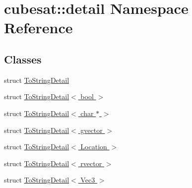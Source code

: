 \hypertarget{namespacecubesat_1_1detail}{}\section{cubesat\+:\+:detail Namespace Reference}
\label{namespacecubesat_1_1detail}
\subsection*{Classes}
\begin{DoxyCompactItemize}
\item 
struct \hyperlink{structcubesat_1_1detail_1_1ToStringDetail}{To\+String\+Detail}
\item 
struct \hyperlink{structcubesat_1_1detail_1_1ToStringDetail_3_01bool_01_4}{To\+String\+Detail$<$ bool $>$}
\item 
struct \hyperlink{structcubesat_1_1detail_1_1ToStringDetail_3_01char_01_5_01_4}{To\+String\+Detail$<$ char $\ast$ $>$}
\item 
struct \hyperlink{structcubesat_1_1detail_1_1ToStringDetail_3_01gvector_01_4}{To\+String\+Detail$<$ gvector $>$}
\item 
struct \hyperlink{structcubesat_1_1detail_1_1ToStringDetail_3_01Location_01_4}{To\+String\+Detail$<$ Location $>$}
\item 
struct \hyperlink{structcubesat_1_1detail_1_1ToStringDetail_3_01rvector_01_4}{To\+String\+Detail$<$ rvector $>$}
\item 
struct \hyperlink{structcubesat_1_1detail_1_1ToStringDetail_3_01Vec3_01_4}{To\+String\+Detail$<$ Vec3 $>$}
\end{DoxyCompactItemize}
